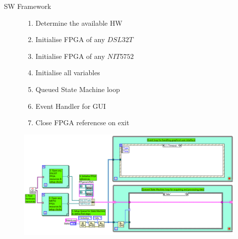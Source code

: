 \documentclass[t,12pt,english
\ifx\beamermode\undefined\else,\beamermode\fi
]{beamer}
\begin{document}
\begin{frame}{SW Framework}

\begin{figure}[!htb]

\begin{block}{\footnotesize{}}\footnotesize{}
\begin{enumerate} 
\vspace{0.05cm}
     \item \footnotesize{Determine the available HW}
     \item \footnotesize{Initialise FPGA of any $DSL32T$}
     \item \footnotesize{Initialise FPGA of any $NIT5752$ }
     \item \footnotesize{Initialise all variables}
     \item \footnotesize{Queued State Machine loop}
     \item \footnotesize{Event Handler for GUI}
     \item \footnotesize{Close FPGA referencse on exit}
\end{enumerate}
\end{block}

\endminipage
{}
\centering
\includegraphics[width=1.1\textwidth]{13.png}
\endminipage
\end{figure}

\end{frame}
\end{document}
